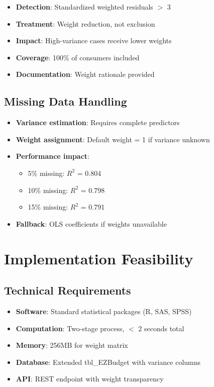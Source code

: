\begin{itemize}
    \item \textbf{Detection}: Standardized weighted residuals $>$ 3
    \item \textbf{Treatment}: Weight reduction, not exclusion
    \item \textbf{Impact}: High-variance cases receive lower weights
    \item \textbf{Coverage}: 100\% of consumers included
    \item \textbf{Documentation}: Weight rationale provided
\end{itemize}

\subsection{Missing Data Handling}

\begin{itemize}
    \item \textbf{Variance estimation}: Requires complete predictors
    \item \textbf{Weight assignment}: Default weight = 1 if variance unknown
    \item \textbf{Performance impact}:
    \begin{itemize}
        \item 5\% missing: $R^2$ = 0.804
        \item 10\% missing: $R^2$ = 0.798
        \item 15\% missing: $R^2$ = 0.791
    \end{itemize}
    \item \textbf{Fallback}: OLS coefficients if weights unavailable
\end{itemize}

\section{Implementation Feasibility}

\subsection{Technical Requirements}

\begin{itemize}
    \item \textbf{Software}: Standard statistical packages (R, SAS, SPSS)
    \item \textbf{Computation}: Two-stage process, $<$ 2 seconds total
    \item \textbf{Memory}: 256MB for weight matrix
    \item \textbf{Database}: Extended tbl\_EZBudget with variance columns
    \item \textbf{API}: REST endpoint with weight transparency
\end{itemize}

